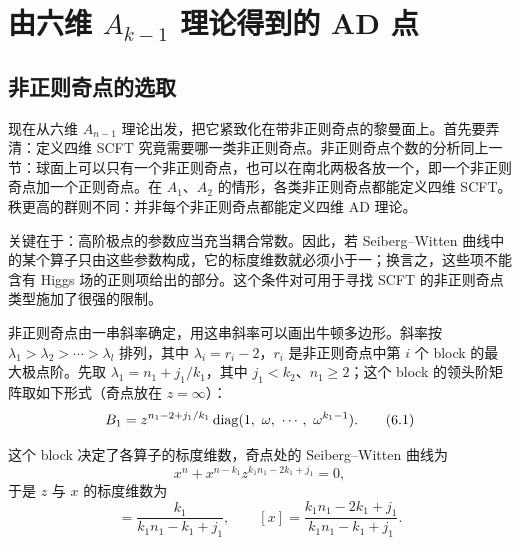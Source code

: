 \section{由六维 $A_{k-1}$ 理论得到的 AD 点}
\label{sec:ak}

\subsection{非正则奇点的选取}
\label{sec:6.1}


现在从六维 $A_{n-1}$ 理论出发，把它紧致化在带非正则奇点的黎曼面上。首先要弄清：定义四维 SCFT 究竟需要哪一类非正则奇点。非正则奇点个数的分析同上一节：球面上可以只有一个非正则奇点，也可以在南北两极各放一个，即一个非正则奇点加一个正则奇点。在 $A_1$、$A_2$ 的情形，各类非正则奇点都能定义四维 SCFT。秩更高的群则不同：并非每个非正则奇点都能定义四维 AD 理论。

关键在于：高阶极点的参数应当充当耦合常数。因此，若 Seiberg--Witten 曲线中的某个算子只由这些参数构成，它的标度维数就必须小于一；换言之，这些项不能含有 Higgs 场的正则项给出的部分。这个条件对可用于寻找 SCFT 的非正则奇点类型施加了很强的限制。

非正则奇点由一串斜率确定，用这串斜率可以画出牛顿多边形。斜率按 $\lambda_1>\lambda_2>\cdots>\lambda_l$ 排列，其中 $\lambda_i=r_i-2$，$r_i$ 是非正则奇点中第 $i$ 个 block 的最大极点阶。先取 $\lambda_1=n_1+j_1/k_1$，其中 $j_1<k_2$、$n_1\ge 2$；这个 block 的领头阶矩阵取如下形式（奇点放在 $z=\infty$）：
\begin{equation}
B_1 = z^{n_1-2+j_1/k_1}\diag(1,\ \omega,\ \cdots,\ \omega^{k_1-1}) .
\label{eq:6.1}\tag{6.1}
\end{equation}

这个 block 决定了各算子的标度维数，奇点处的 Seiberg--Witten 曲线为
\begin{equation}
x^n + x^{n-k_1}z^{k_1n_1-2k_1+j_1} = 0 ,
\label{eq:6.2}\tag{6.2}
\end{equation}
于是 $z$ 与 $x$ 的标度维数为
\begin{equation}
[z] = \frac{k_1}{k_1n_1-k_1+j_1},\qquad
[x] = \frac{k_1n_1-2k_1+j_1}{k_1n_1-k_1+j_1} .
\label{eq:6.3}\tag{6.3}
\end{equation}

